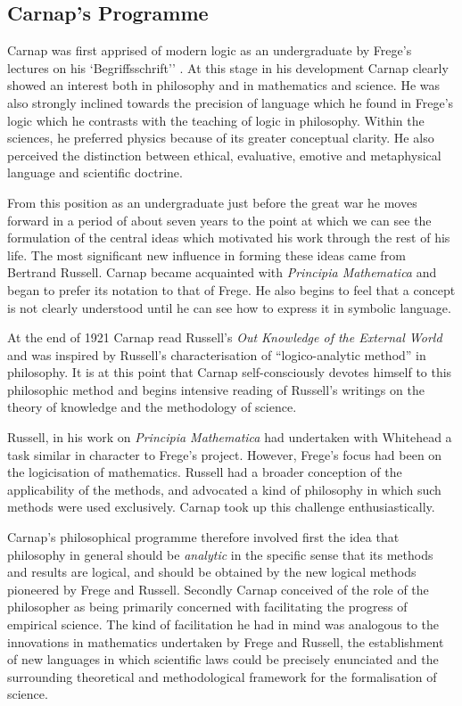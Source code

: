\subsection{Carnap's Programme}

Carnap was first apprised of modern logic as an undergraduate by Frege's lectures on his `Begriffsschrift'' \cite{frege1879,heijenoort67}.
At this stage in his development Carnap clearly showed an interest both in philosophy and in mathematics and science.
He was also strongly inclined towards the precision of language which he found in Frege's logic which he contrasts with the teaching of logic in philosophy.
Within the sciences, he preferred physics because of its greater conceptual clarity.
He also perceived the distinction between ethical, evaluative, emotive and metaphysical language and scientific doctrine.

From this position as an undergraduate just before the great war he moves forward in a period of about seven years to the point at which we can see the formulation of the central ideas which motivated his work through the rest of his life.
The most significant new influence in forming these ideas came from Bertrand Russell.
Carnap became acquainted with \emph{Principia Mathematica}\cite{russell10} and began to prefer its notation to that of Frege.
He also begins to feel that a concept is not clearly understood until he can see how to express it in symbolic language.

At the end of 1921 Carnap read Russell's \emph{Out Knowledge of the External World}\cite{russell1921} and was inspired by Russell's characterisation of ``logico-analytic method'' in philosophy.
It is at this point that Carnap self-consciously devotes himself to this philosophic method and begins intensive reading of Russell's writings on the theory of knowledge and the methodology of science.

Russell, in his work on \emph{Principia Mathematica} had undertaken with Whitehead a task similar in character to Frege's project.
However, Frege's focus had been on the logicisation of mathematics.
Russell had a broader conception of the applicability of the methods, and advocated a kind of philosophy in which such methods were used exclusively.
Carnap took up this challenge enthusiastically.

Carnap's philosophical programme therefore involved first the idea that philosophy in general should be \emph{analytic} in the specific sense that its methods and results are logical, and should be obtained by the new logical methods pioneered by Frege and Russell.
Secondly Carnap conceived of the role of the philosopher as being primarily concerned with facilitating the progress of empirical science.
The kind of facilitation he had in mind was analogous to the innovations in mathematics undertaken by Frege and Russell, the establishment of new languages in which scientific laws could be precisely enunciated and the surrounding theoretical and methodological framework for the formalisation of science.

